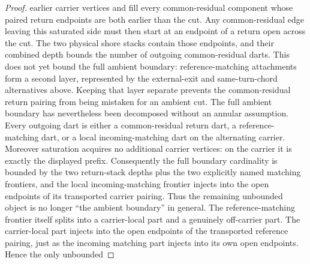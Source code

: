 \begin{proof}
earlier carrier vertices and fill every common-residual component whose paired
return endpoints are both earlier than the cut.  Any common-residual edge
leaving this saturated side must then start at an endpoint of a return open
across the cut.  The two physical shore stacks contain those endpoints, and
their combined depth bounds the number of outgoing common-residual darts.
This does not yet bound the full ambient boundary: reference-matching
attachments form a second layer, represented by the external-exit and
same-turn-chord alternatives above.  Keeping that layer separate prevents the
common-residual return pairing from being mistaken for an ambient cut.
The full ambient boundary has nevertheless been decomposed without an annular
assumption.  Every outgoing dart is either a common-residual return dart, a
reference-matching dart, or a local incoming-matching dart on the alternating
carrier.  Moreover saturation acquires no additional carrier vertices: on the
carrier it is exactly the displayed prefix.  Consequently the full boundary
cardinality is bounded by the two return-stack depths plus the two explicitly
named matching frontiers, and the local incoming-matching frontier injects
into the open endpoints of its transported carrier pairing.
Thus the remaining unbounded object is no longer ``the ambient boundary'' in
general.  The reference-matching frontier itself splits into a carrier-local
part and a genuinely off-carrier part.  The carrier-local part injects into
the open endpoints of the transported reference pairing, just as the incoming
matching part injects into its own open endpoints.  Hence the only unbounded

\end{proof}
